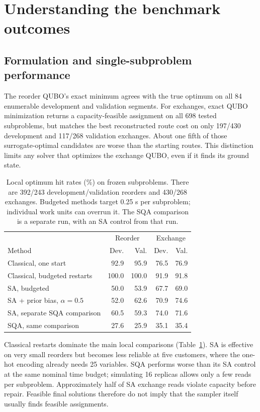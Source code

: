 \documentclass[11pt,a4paper]{article}
\begin{document}
\section{Understanding the benchmark outcomes}

\subsection{Formulation and single-subproblem performance}

The reorder QUBO's exact minimum agrees with the true optimum on all 84
enumerable development and validation segments. For exchanges, exact QUBO
minimization returns a capacity-feasible assignment on all 698 tested
subproblems, but matches the best reconstructed route cost on only 197/430
development and 117/268 validation exchanges. About one fifth of those
surrogate-optimal candidates are worse than the starting routes. This
distinction limits any solver that optimizes the exchange QUBO, even if it
finds its ground state.

\begin{table}[tbp]
\centering\small
\caption{Local optimum hit rates (\%) on frozen subproblems. There are
392/243 development/validation reorders and 430/268 exchanges. Budgeted
methods target 0.25 s per subproblem; individual work units can overrun it.
The SQA comparison is a separate run, with an SA control from that run.}
\label{tab:local}
\begin{tabular}{@{}lrrrr@{}}
\toprule
 & \multicolumn{2}{c}{Reorder} & \multicolumn{2}{c}{Exchange}\\
Method & Dev. & Val. & Dev. & Val.\\
\midrule
Classical, one start & 92.9 & 95.9 & 76.5 & 76.9\\
Classical, budgeted restarts & 100.0 & 100.0 & 91.9 & 91.8\\
SA, budgeted & 50.0 & 53.9 & 67.7 & 69.0\\
SA + prior bias, $\alpha=0.5$ & 52.0 & 62.6 & 70.9 & 74.6\\
\midrule
SA, separate SQA comparison & 60.5 & 59.3 & 74.0 & 71.6\\
SQA, same comparison & 27.6 & 25.9 & 35.1 & 35.4\\
\bottomrule
\end{tabular}
\end{table}

Classical restarts dominate the main local comparisons
(Table~\ref{tab:local}). SA is effective on very small reorders but becomes
less reliable at five customers, where the one-hot encoding already needs
25 variables. SQA performs worse than its SA control at the same nominal
time budget; simulating 16 replicas allows only a few reads per subproblem.
Approximately half of SA exchange reads violate capacity before repair.
Feasible final solutions therefore do not imply that the sampler itself
usually finds feasible assignments.
\end{document}
